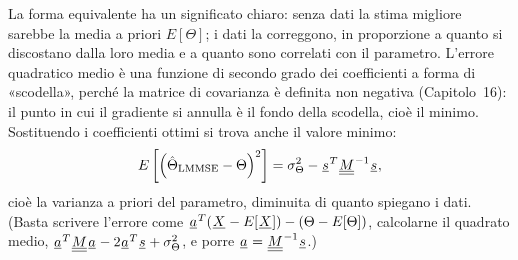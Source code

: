 La forma equivalente ha un significato chiaro: senza dati la stima migliore sarebbe la media a priori $E[\Theta]$; i
dati la correggono, in proporzione a quanto si discostano dalla loro media e a quanto sono correlati con il parametro.
L'errore quadratico medio è una funzione di secondo grado dei coefficienti a forma di «scodella», perché la matrice di
covarianza è definita non negativa (Capitolo~16): il punto in cui il gradiente si annulla è il fondo della scodella,
cioè il minimo. Sostituendo i coefficienti ottimi si trova anche il valore minimo:
\[ E\left[ \left( \hat\Theta_{\text{LMMSE}} - \Theta \right)^2 \right] = \sigma_\Theta^2 - {\mkern1mu\underline{s}\mkern1mu}^T {\mkern1mu\underline{\underline{M}}\mkern1mu}^{-1}
   {\mkern1mu\underline{s}\mkern1mu} , \]
cioè la varianza a priori del parametro, diminuita di quanto spiegano i dati. (Basta scrivere l'errore come ${\mkern1mu\underline{a}\mkern1mu}^T
({\mkern1mu\underline{X}\mkern1mu} - E[{\mkern1mu\underline{X}\mkern1mu}]) - (\Theta - E[\Theta])$, calcolarne il quadrato medio, ${\mkern1mu\underline{a}\mkern1mu}^T {\mkern1mu\underline{\underline{M}}\mkern1mu}{\mkern1mu\underline{a}\mkern1mu} -
2{\mkern1mu\underline{a}\mkern1mu}^T {\mkern1mu\underline{s}\mkern1mu} + \sigma_\Theta^2$, e porre ${\mkern1mu\underline{a}\mkern1mu} = {\mkern1mu\underline{\underline{M}}\mkern1mu}^{-1}{\mkern1mu\underline{s}\mkern1mu}$.)



